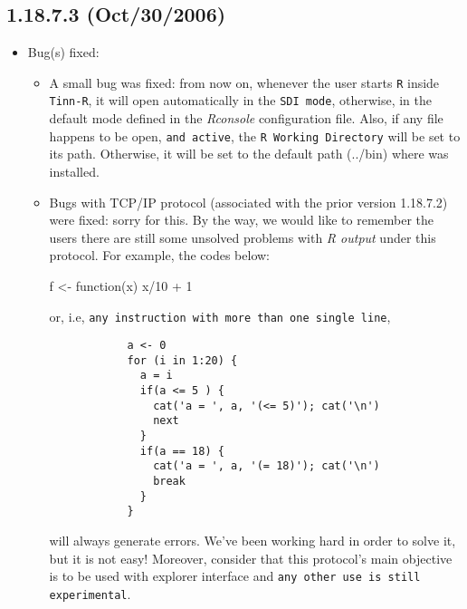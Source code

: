 \subsection*{1.18.7.3 (Oct/30/2006)}
\begin{itemize}
  \item Bug(s) fixed:
    \begin{itemize}
      \item A small bug was fixed: from now on, whenever the user starts
        \texttt{R} inside \texttt{Tinn-R}, it will open automatically
        in the \texttt{SDI mode}, otherwise, in the default mode defined
        in the \textit{Rconsole} configuration file. Also, if any file
        happens to be open, \texttt{and active}, the \texttt{R Working
          Directory} will be set to its path. Otherwise, it will be set to
        the default path (../bin) where \RR{} was installed.
      \item Bugs with TCP/IP protocol (associated with the prior version
        1.18.7.2) were fixed: sorry for this. By the way, we would like
        to remember the users there are still some unsolved problems
        with \textit{R output} under this protocol. For example, the
        codes below:

        \begin{Scode}
          f <- function(x) {
            x/10 + 1
          }
        \end{Scode}

        or, i.e, \texttt{any instruction with more than one single line},

        \begin{footnotesize}
          \begin{verbatim}
            a <- 0
            for (i in 1:20) {
              a = i
              if(a <= 5 ) {
                cat('a = ', a, '(<= 5)'); cat('\n')
                next
              }
              if(a == 18) {
                cat('a = ', a, '(= 18)'); cat('\n')
                break
              }
            }
          \end{verbatim}
        \end{footnotesize}

        will always generate errors. We've been working hard in order to solve it,
        but it is not easy!
        Moreover, consider that this protocol's main objective is to be used with \RR{}
        explorer interface and \texttt{any other use is still experimental}.
    \end{itemize}
\end{itemize}


